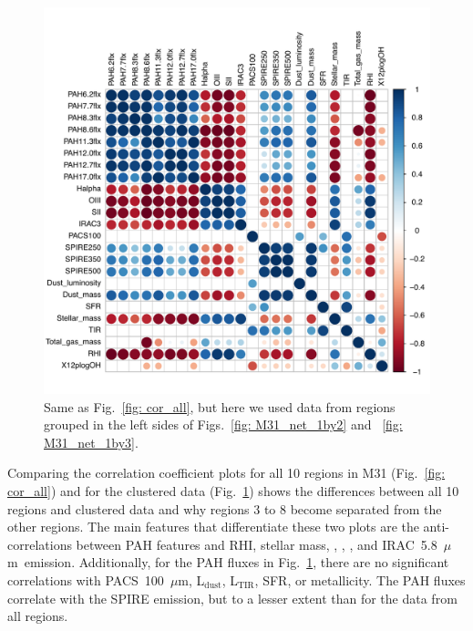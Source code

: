         \begin{figure}
        \includegraphics[width=\textwidth]{../image_paper3/images0.01/cor_plots/M31_derived_3_to_8_core_plot_for_paper.pdf}
        \caption[Pearson correlation coefficients for data from the clustered regions in M31]{Same as Fig.~\ref{fig: cor_all}, but here we used data from regions grouped in the left sides of Figs.~\ref{fig: M31_net_1by2} and ~\ref{fig: M31_net_1by3}.}
          \label{fig: cor_cluster1}
        \end{figure}
        
       
        Comparing the correlation coefficient plots for all 10 regions in M31 (Fig.~\ref{fig: cor_all}) and for the clustered data (Fig.~\ref{fig: cor_cluster1}) shows the differences between all 10 regions and clustered data and why regions 3 to 8 become separated from the other regions.
        The main features that differentiate these two plots are the anti-correlations between PAH features and RHI, stellar mass, \halpha, \sii, \oiii, and IRAC~5.8~$\mu$m~emission.
        Additionally, for the PAH fluxes in Fig.~\ref{fig: cor_cluster1}, there are no significant correlations with PACS~100~$\mu$m, L$_\mathrm{dust}$, L$_\mathrm{TIR}$, SFR, or metallicity.
        The PAH fluxes correlate with the SPIRE emission, but to a lesser extent than for the data from all regions.
        
